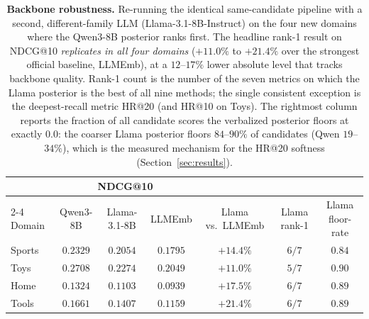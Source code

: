 \begin{table}[t]
\centering
\scriptsize
\setlength{\tabcolsep}{5pt}
\caption{\textbf{Backbone robustness.} Re-running the identical same-candidate
pipeline with a second, different-family LLM (Llama-3.1-8B-Instruct) on the four
new domains where the Qwen3-8B posterior ranks first. The headline rank-1 result
on NDCG@10 \emph{replicates in all four domains} ($+11.0\%$ to $+21.4\%$ over the
strongest official baseline, LLMEmb), at a $12$--$17\%$ lower absolute level that
tracks backbone quality. Rank-1 count is the number of the seven metrics on which
the Llama posterior is the best of all nine methods; the single consistent
exception is the deepest-recall metric HR@20 (and HR@10 on Toys). The rightmost
column reports the fraction of all candidate scores the verbalized posterior
floors at exactly $0.0$: the coarser Llama posterior floors $84$--$90\%$ of
candidates (Qwen $19$--$34\%$), which is the measured mechanism for the HR@20
softness (Section~\ref{sec:results}).}
\label{tab:second_backbone}
\begin{tabular}{lcccccc}
\toprule
& \multicolumn{3}{c}{NDCG@10} & & & \\
\cmidrule(lr){2-4}
Domain & Qwen3-8B & Llama-3.1-8B & LLMEmb & Llama vs.\ LLMEmb & Llama rank-1 & Llama floor-rate \\
\midrule
Sports & $0.2329$ & $0.2054$ & $0.1795$ & $+14.4\%$ & $6/7$ & $0.84$ \\
Toys   & $0.2708$ & $0.2274$ & $0.2049$ & $+11.0\%$ & $5/7$ & $0.90$ \\
Home   & $0.1324$ & $0.1103$ & $0.0939$ & $+17.5\%$ & $6/7$ & $0.89$ \\
Tools  & $0.1661$ & $0.1407$ & $0.1159$ & $+21.4\%$ & $6/7$ & $0.89$ \\
\bottomrule
\end{tabular}
\end{table}
